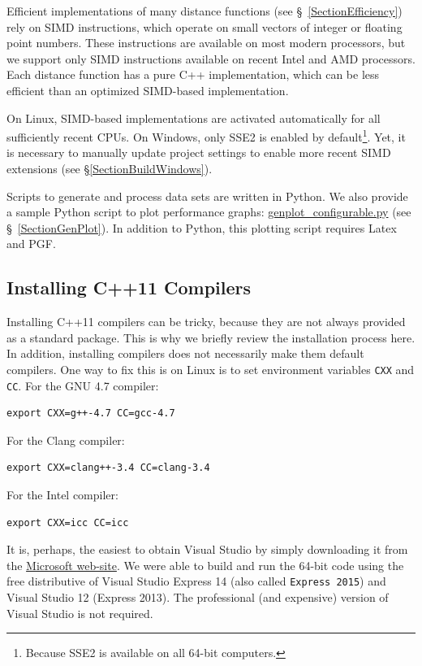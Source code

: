 \documentclass[runningheads,a4paper]{llncs}
\newcommand{\replocfile}{https://github.com/searchivarius/nmslib/blob/v1.5/}
\newcommand{\ttt}[1]{\texttt{#1}}
\begin{document}
{Efficient implementations of many distance functions (see \S~\ref{SectionEfficiency})
rely on SIMD instructions,
which operate on small  vectors of integer or floating point numbers. 
These instructions are available on most modern processors,
but we support only SIMD instructions available on recent Intel and AMD processors.   
Each distance function has a pure C++ implementation,
which can be less efficient than an optimized SIMD-based implementation.

On Linux, SIMD-based implementations are activated automatically 
for all sufficiently recent CPUs. 
On Windows, only SSE2 is enabled by default\footnote{Because SSE2 is available on all 64-bit computers.}. 
Yet, it is necessary to manually update project settings 
to enable more recent SIMD extensions (see \S\ref{SectionBuildWindows}).

Scripts to generate and process data sets are written in Python.
We also provide a sample Python script to plot performance graphs: \href{\replocfile scripts/genplot_configurable.py}{genplot\_configurable.py} (see \S~\ref{SectionGenPlot}).
In addition to Python, this plotting script requires Latex and PGF. 

\subsection{Installing C++11 Compilers}
Installing C++11 compilers can be tricky, 
because they are not always provided as a standard package.
This is why we briefly review the installation process here. 
In addition, installing compilers does 
not necessarily make them default compilers.
One way to fix this is on Linux is to set environment variables \ttt{CXX} and \ttt{CC}.
For the GNU 4.7 compiler:
\begin{verbatim}
export CXX=g++-4.7 CC=gcc-4.7 
\end{verbatim}
For the Clang compiler:
\begin{verbatim}
export CXX=clang++-3.4 CC=clang-3.4
\end{verbatim}
For the Intel compiler:
\begin{verbatim}
export CXX=icc CC=icc 
\end{verbatim}

It is, perhaps, the easiest to obtain Visual Studio by simply downloading
it from the \href{https://www.microsoft.com/en-us/download/default.aspx}{Microsoft web-site}.
We were able to build and run the 64-bit code using the free distributive of Visual Studio Express 14 (also called 
\ttt{Express 2015}) and Visual Studio 12 (Express 2013). The professional (and expensive) version of Visual Studio is not required. 


}
\end{document}
